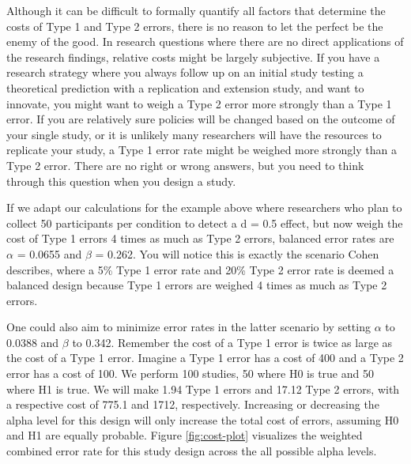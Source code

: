 \documentclass[,jou,floatsintext]{apa6}
\begin{document}
Although it can be difficult to formally quantify all factors that determine the costs of Type 1 and Type 2 errors, there is no reason to let the perfect be the enemy of the good. In research questions where there are no direct applications of the research findings, relative costs might be largely subjective. If you have a research strategy where you always follow up on an initial study testing a theoretical prediction with a replication and extension study, and want to innovate, you might want to weigh a Type 2 error more strongly than a Type 1 error. If you are relatively sure policies will be changed based on the outcome of your single study, or it is unlikely many researchers will have the resources to replicate your study, a Type 1 error rate might be weighed more strongly than a Type 2 error. There are no right or wrong answers, but you need to think through this question when you design a study.

If we adapt our calculations for the example above where researchers who plan to collect 50 participants per condition to detect a d = 0.5 effect, but now weigh the cost of Type 1 errors 4 times as much as Type 2 errors, balanced error rates are \(\alpha\) = 0.0655 and \(\beta\) = 0.262. You will notice this is exactly the scenario Cohen describes, where a 5\% Type 1 error rate and 20\% Type 2 error rate is deemed a balanced design because Type 1 errors are weighed 4 times as much as Type 2 errors.

One could also aim to minimize error rates in the latter scenario by setting \(\alpha\) to 0.0388 and \(\beta\) to 0.342. Remember the cost of a Type 1 error is twice as large as the cost of a Type 1 error. Imagine a Type 1 error has a cost of 400 and a Type 2 error has a cost of 100. We perform 100 studies, 50 where H0 is true and 50 where H1 is true. We will make 1.94 Type 1 errors and 17.12 Type 2 errors, with a respective cost of 775.1 and 1712, respectively. Increasing or decreasing the alpha level for this design will only increase the total cost of errors, assuming H0 and H1 are equally probable. Figure \ref{fig:cost-plot} visualizes the weighted combined error rate for this study design across the all possible alpha levels.
\end{document}
